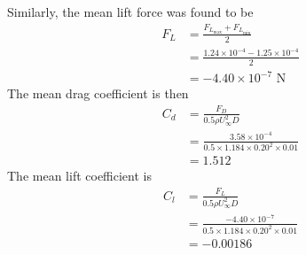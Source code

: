Similarly, the mean lift force was found to be
\begin{align*}
    F_L &= \frac{F_{L_{\text{max}}} + F_{L_{\text{min}}}}{2} \\
    &= \frac{1.24 \times 10^{-4} - 1.25 \times 10^{-4}}{2} \\
    &= \boxed{-4.40 \times 10^{-7} \text{ N}}
\end{align*}
The mean drag coefficient is then
\begin{align*}
    C_d &= \frac{F_D}{0.5\rho U_\infty^2 D} \\
    &= \frac{3.58 \times 10^{-4}}{0.5 \times 1.184 \times 0.20^2 \times 0.01} \\
    &= \boxed{1.512}
\end{align*}
The mean lift coefficient is
\begin{align*}
    C_l &= \frac{F_L}{0.5\rho U_\infty^2 D} \\
    &= \frac{-4.40 \times 10^{-7}}{0.5 \times 1.184 \times 0.20^2 \times 0.01} \\
    &= \boxed{-0.00186}
\end{align*}

